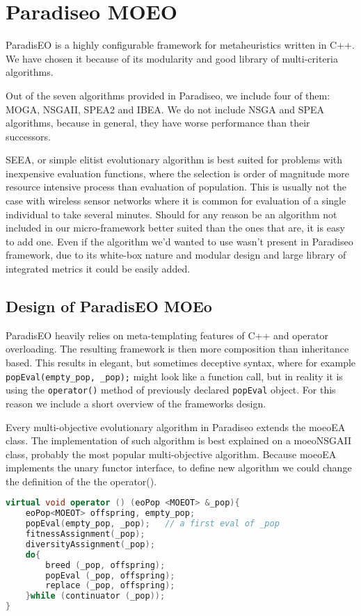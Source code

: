\documentclass[12pt,oneside]{fithesis2}
\begin{document}
\section{Paradiseo MOEO}
ParadisEO is a highly configurable framework for metaheuristics written in C++. We have chosen it because of its modularity and good library of multi-criteria algorithms.\cite{liefooghe2007Paradiseo} 

Out of the seven algorithms provided in Paradiseo, we include four of them: MOGA, NSGAII, SPEA2 and IBEA. We do not include NSGA and SPEA algorithms, because in general, they have worse performance than their successors.\cite{deb2002fast}\cite{zitzler2001spea2} 

SEEA, or simple elitist evolutionary algorithm is best suited for problems with inexpensive evaluation functions, where the selection is order of magnitude more resource intensive process than evaluation of population. This is usually not the case with wireless sensor networks where it is common for evaluation of a single individual to take several minutes. Should for any reason be an algorithm not included in our micro-framework better suited than the ones that are, it is easy to add one. Even if the algorithm we'd wanted to use wasn't present in Paradiseo framework, due to its white-box nature and modular design and large library of integrated metrics it could be easily added. 

\subsection{Design of ParadisEO MOEo}
ParadisEO heavily relies on meta-templating features of C++ and operator overloading. The resulting framework is then more composition than inheritance based. This results in elegant, but sometimes deceptive syntax, where for example \lstinline{popEval(empty_pop, _pop);} might look like a function call, but in reality it is using the \lstinline{operator()} method of previously declared \lstinline{popEval} object. For this reason we include a short overview of the frameworks design.

Every multi-objective evolutionary algorithm in Paradiseo extends the moeoEA class. The implementation of such algorithm is best explained on a  moeoNSGAII class, probably the most popular multi-objective algorithm. Because moeoEA implements the unary functor interface, to define new algorithm we could change the definition of the the operator().

\begin{lstlisting}[language=C++,label=evolution,caption=NSGAII algorithm in Paradiseo]
virtual void operator () (eoPop <MOEOT> &_pop){
    eoPop<MOEOT> offspring, empty_pop;
    popEval(empty_pop, _pop);	// a first eval of _pop
    fitnessAssignment(_pop);
    diversityAssignment(_pop);
    do{
        breed (_pop, offspring);
        popEval (_pop, offspring);
        replace (_pop, offspring);
    }while (continuator (_pop));
}
\end{lstlisting}
\end{document}
